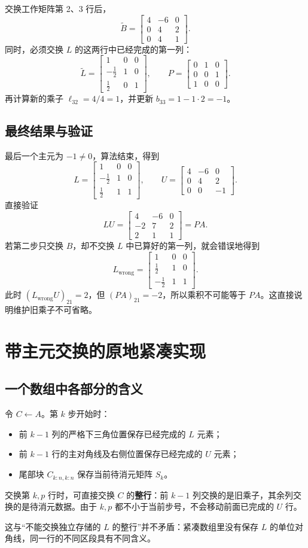 \documentclass[UTF8,11pt,a4paper,fontset=fandol]{ctexart}
\newcommand{\mat}[1]{\begin{bmatrix}#1\end{bmatrix}}
\begin{document}
交换工作矩阵第 2、3 行后，
\[
\widetilde B=\mat{4&-6&0\\0&4&2\\0&4&1}.
\]
同时，必须交换 $L$ 的这两行中已经完成的第一列：
\[
\widetilde L=\mat{1&0&0\\-\frac12&1&0\\\frac12&0&1},\qquad
P=\mat{0&1&0\\0&0&1\\1&0&0}.
\]
再计算新的乘子 $\ell_{32}=4/4=1$，并更新 $b_{33}=1-1\cdot2=-1$。

\subsection{最终结果与验证}
最后一个主元为 $-1\ne0$，算法结束，得到
\[
L=\mat{1&0&0\\-\frac12&1&0\\\frac12&1&1},\qquad
U=\mat{4&-6&0\\0&4&2\\0&0&-1}.
\]
直接验证
\[
LU=\mat{4&-6&0\\-2&7&2\\2&1&1}=PA.
\]
若第二步只交换 $B$，却不交换 $L$ 中已算好的第一列，就会错误地得到
\[
L_{\mathrm{wrong}}=\mat{1&0&0\\\frac12&1&0\\-\frac12&1&1}.
\]
此时 $(L_{\mathrm{wrong}}U)_{21}=2$，但 $(PA)_{21}=-2$，所以乘积不可能等于 $PA$。这直接说明维护旧乘子不可省略。

\section{带主元交换的原地紧凑实现}
\subsection{一个数组中各部分的含义}
令 $C\gets A$。第 $k$ 步开始时：
\begin{itemize}
\item 前 $k-1$ 列的严格下三角位置保存已经完成的 $L$ 元素；
\item 前 $k-1$ 行的主对角线及右侧位置保存已经完成的 $U$ 元素；
\item 尾部块 $C_{k:n,k:n}$ 保存当前待消元矩阵 $S_k$。
\end{itemize}
交换第 $k,p$ 行时，可直接交换 $C$ 的\textbf{整行}：前 $k-1$ 列交换的是旧乘子，其余列交换的是待消元数据。由于 $k,p$ 都不小于当前步号，不会移动前面已完成的 $U$ 行。

这与“不能交换独立存储的 $L$ 的整行”并不矛盾：紧凑数组里没有保存 $L$ 的单位对角线，同一行的不同区段具有不同含义。
\end{document}
